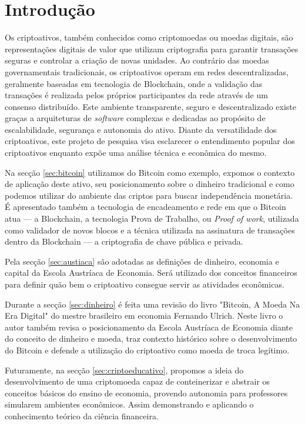 
\chapter{Introdução}

Os criptoativos, também conhecidos como criptomoedas ou moedas digitais, são representações digitais de valor que utilizam criptografia para garantir transações seguras e controlar a criação de novas unidades. Ao contrário das moedas governamentais tradicionais, os criptoativos operam em redes descentralizadas, geralmente baseadas em tecnologia de Blockchain, onde a validação das transações é realizada pelos próprios participantes da rede através de um consenso distribuído. Este ambiente transparente, seguro e descentralizado existe graças a arquiteturas de \textit{software} complexas e dedicadas ao propósito de escalabilidade, segurança e autonomia do ativo. Diante da versatilidade dos criptoativos, este projeto de pesquisa visa esclarecer o entendimento popular dos criptoativos enquanto expõe uma análise técnica e econômica do mesmo. 

Na secção \ref*{sec:bitcoin} utilizamos do Bitcoin como exemplo, expomos o contexto de aplicação deste ativo, seu posicionamento sobre o dinheiro tradicional e como podemos utilizar do ambiente das criptos para buscar independência monetária. É apresentado também a tecnologia de encadeamento e rede em que o Bitcoin atua — a Blockchain, a tecnologia Prova de Trabalho, ou \textit{Proof of work}, utilizada como validador de novos blocos e a técnica utilizada na assinatura de transações dentro da Blockchain — a criptografia de chave pública e privada.

Pela secção \ref*{sec:austiaca} são adotadas as definições de dinheiro, economia e capital da Escola Austríaca de Economia. Será utilizado dos conceitos financeiros para definir quão bem o criptoativo consegue servir as atividades econômicas.

Durante a secção \ref*{sec:dinheiro} é feita uma revisão do livro "Bitcoin, A Moeda Na Era Digital" do mestre brasileiro em economia Fernando Ulrich. Neste livro o autor também revisa o posicionamento da Escola Austríaca de Economia diante do conceito de dinheiro e moeda, traz contexto histórico sobre o desenvolvimento do Bitcoin e defende a utilização do criptoativo como moeda de troca legítimo.

Futuramente, na secção \ref*{sec:criptoeducativo}, propomos a ideia do desenvolvimento de uma criptomoeda capaz de conteinerizar e abstrair os conceitos básicos do ensino de economia, provendo autonomia para professores simularem ambientes econômicos. Assim demonstrando e aplicando o conhecimento teórico da ciência financeira.

